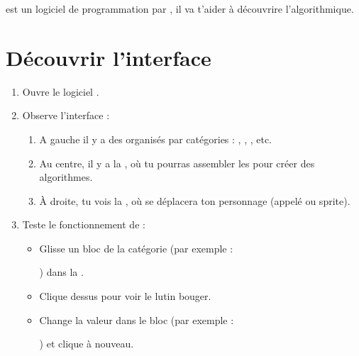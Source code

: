 
\emptyBackground




\Scratch est un logiciel de programmation par \block, il va t'aider à découvrire l'algorithmique.

\section{Découvrir l'interface}

\begin{enumerate}
    \item Ouvre le logiciel \Scratch.
    \item Observe l'interface :
    \begin{enumerate}
        \item A gauche il y a des \block
        organisés par catégories : \smotion, \slooks, \ssound, etc.
        \item Au centre, il y a la , où tu pourras assembler les \block pour créer des algorithmes.
        \item À droite, tu vois la  , où se déplacera ton personnage (appelé  ou sprite).  
    \end{enumerate}
    \item Teste le fonctionnement de  \Scratch : 
    \begin{itemize} 
        \item Glisse un bloc de la catégorie \smotion
        (par exemple :
        \begin{scratch}\end{scratch}
        ) dans la . 
        \item Clique dessus pour voir le lutin bouger. 
        \item Change la valeur dans le bloc
        (par exemple :
        \begin{scratch}\end{scratch}
        ) et clique à nouveau. 
    \end{itemize}
\end{enumerate}

